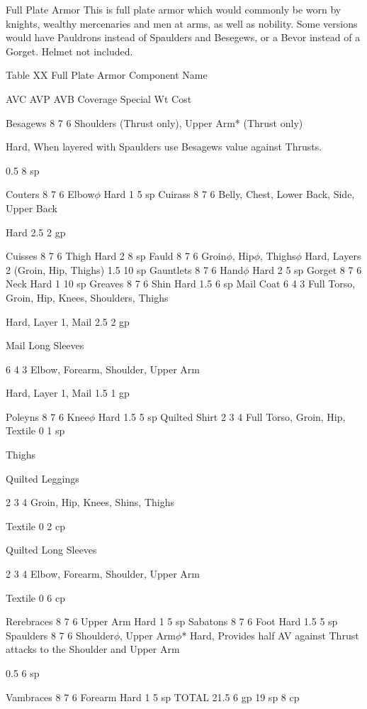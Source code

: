 \documentclass[oneside,11pt,english]{book}
\begin{document}
Full Plate Armor 
This is full plate armor which would commonly be worn by knights, wealthy mercenaries and men at 
arms, as well as nobility. Some versions would have Pauldrons instead of Spaulders and Besegews, or a 
Bevor instead of a Gorget. Helmet not included. 

 
Table XX Full Plate Armor 
Component 
Name 

AVC AVP AVB Coverage Special Wt Cost 

Besagews 8 7 6 Shoulders (Thrust only), 
Upper Arm* (Thrust only) 

Hard, When layered with Spaulders use 
Besagews value against Thrusts. 

0.5 8 sp 

Couters 8 7 6 Elbow$\phi$ Hard 1 5 sp 
Cuirass 8 7 6 Belly, Chest, Lower Back, 
Side, Upper Back 

Hard 2.5 2 gp 

Cuisses 8 7 6 Thigh Hard 2 8 sp 
Fauld 8 7 6 Groin$\phi$, Hip$\phi$, Thighs$\phi$ Hard, Layers 2 (Groin, Hip, Thighs) 1.5 10 
sp 
Gauntlets 8 7 6 Hand$\phi$ Hard 2 5 sp 
Gorget 8 7 6 Neck Hard 1 10 
sp 
Greaves 8 7 6 Shin Hard 1.5 6 sp 
Mail Coat 6 4 3 Full Torso, Groin, Hip, 
Knees, Shoulders, Thighs 

Hard, Layer 1, Mail 2.5 2 gp 

Mail Long 
Sleeves 

6 4 3 Elbow, Forearm, Shoulder, 
Upper Arm 

Hard, Layer 1, Mail 1.5 1 gp 

Poleyns 8 7 6 Knee$\phi$ Hard 1.5 5 sp 
Quilted Shirt 2 3 4 Full Torso, Groin, Hip, Textile 0 1 sp 


Thighs 

Quilted 
Leggings 

2 3 4 Groin, Hip, Knees, Shins, 
Thighs 

Textile 0 2 cp 

Quilted Long 
Sleeves 

2 3 4 Elbow, Forearm, Shoulder, 
Upper Arm 

Textile 0 6 cp 

Rerebraces 8 7 6 Upper Arm Hard 1 5 sp 
Sabatons 8 7 6 Foot Hard 1.5 5 sp 
Spaulders 8 7 6 Shoulder$\phi$, Upper Arm$\phi$* Hard, Provides half AV against Thrust 
attacks to the Shoulder and Upper Arm 

0.5 6 sp 

Vambraces 8 7 6 Forearm Hard 1 5 sp 
TOTAL 21.5 6 gp 
19 
sp 
8 cp 

 
\end{document}
